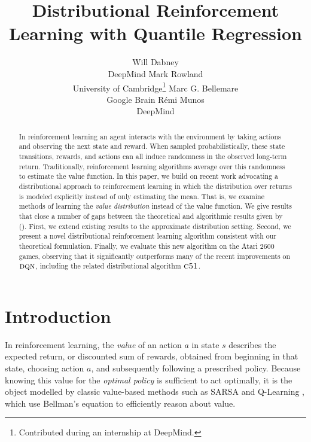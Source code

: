 \documentclass[letterpaper]{article}
\def \cfo {\textsc{c51}}
\def \dqn {\textsc{dqn}}
\newcommand{\citet}[1]{\citeauthor{#1} (\citeyear{#1})}
\begin{document}
\title{Distributional Reinforcement Learning with Quantile Regression}
\author{Will Dabney\\ DeepMind \And Mark Rowland\\ University of Cambridge\thanks{Contributed during an internship at DeepMind.} \And Marc G. Bellemare\\ Google Brain \And R\'emi Munos\\ DeepMind}

\nocopyright

\maketitle
\begin{abstract}
In reinforcement learning an agent interacts with the environment by taking actions and observing the next state and reward. When sampled probabilistically, these state transitions, rewards, and actions can all induce randomness in the observed long-term return. Traditionally, reinforcement learning algorithms average over this randomness to estimate the value function. In this paper, we build on recent work advocating a distributional approach to reinforcement learning in which the distribution over returns is modeled explicitly instead of only estimating the mean. That is, we examine methods of learning the \textit{value distribution} instead of the value function. We give results that close a number of gaps between the theoretical and algorithmic results given by \citet{c51}. First, we extend existing results to the approximate distribution setting. Second, we present a novel distributional reinforcement learning algorithm consistent with our theoretical formulation. Finally, we evaluate this new algorithm on the Atari 2600 games, observing that it significantly outperforms many of the recent improvements on $\dqn$, including the related distributional algorithm $\cfo$.
\end{abstract}

\section{Introduction}

In reinforcement learning, the \emph{value} of an action $a$ in state $s$ describes the expected return, or discounted sum of rewards, obtained from beginning in that state, choosing action $a$, and subsequently following a prescribed policy. Because knowing this value for the \emph{optimal policy} is sufficient to act optimally, it is the object modelled by classic value-based methods such as SARSA \cite{rummery94online} and Q-Learning \cite{watkins1992q}, which use Bellman's equation \cite{bellman57dynamic} to efficiently reason about value.
\end{document}
